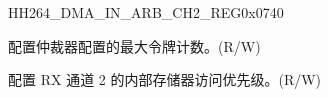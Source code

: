 \begin{register}{H}{H264\_DMA\_IN\_ARB\_CH2\_REG}{0x0740}\label{regdesc:H264DMAINARBCH2REG}
%
%
%
%
\regnewline%
\begin{regdesc}\begin{reglist}
\label{fielddesc:H264DMAINARBTOKENNUMCH2}\item [H264\_DMA\_IN\_ARB\_TOKEN\_NUM\_CH2] 配置仲裁器配置的最大令牌计数。(R/W)
\label{fielddesc:H264DMAINTERINARBPRIORITYCH2}\item [H264\_DMA\_INTER\_IN\_ARB\_PRIORITY\_CH2] 配置 RX 通道 2 的内部存储器访问优先级。(R/W)
\end{reglist}\end{regdesc}
\end{register}



